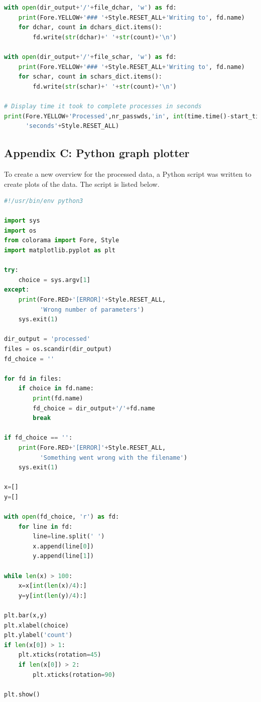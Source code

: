 \documentclass[a4paper,12pt]{article}
\begin{document}
\begin{lstlisting}[language=Python]
with open(dir_output+'/'+file_dchar, 'w') as fd:
    print(Fore.YELLOW+'### '+Style.RESET_ALL+'Writing to', fd.name)
    for dchar, count in dchars_dict.items():
        fd.write(str(dchar)+' '+str(count)+'\n')

with open(dir_output+'/'+file_schar, 'w') as fd:
    print(Fore.YELLOW+'### '+Style.RESET_ALL+'Writing to', fd.name)
    for schar, count in schars_dict.items():
        fd.write(str(schar)+' '+str(count)+'\n')

# Display time it took to complete processes in seconds
print(Fore.YELLOW+'Processed',nr_passwds,'in', int(time.time()-start_time),
      'seconds'+Style.RESET_ALL)
\end{lstlisting}

\subsection{Appendix C: Python graph plotter}
\label{app:pyplot}

To create a new overview for the processed data, a Python script was written to create plots of the data. The script is listed below.

\begin{lstlisting}[language=Python]
#!/usr/bin/env python3

import sys
import os
from colorama import Fore, Style
import matplotlib.pyplot as plt

try:
    choice = sys.argv[1]
except:
    print(Fore.RED+'[ERROR]'+Style.RESET_ALL,
          'Wrong number of parameters')
    sys.exit(1)

dir_output = 'processed'
files = os.scandir(dir_output)
fd_choice = ''

for fd in files:
    if choice in fd.name:
        print(fd.name)
        fd_choice = dir_output+'/'+fd.name
        break

if fd_choice == '':
    print(Fore.RED+'[ERROR]'+Style.RESET_ALL,
          'Something went wrong with the filename')
    sys.exit(1)
    
x=[]
y=[]
    
with open(fd_choice, 'r') as fd:
    for line in fd:
        line=line.split(' ')
        x.append(line[0])
        y.append(line[1])

while len(x) > 100:
    x=x[int(len(x)/4):]
    y=y[int(len(y)/4):]

plt.bar(x,y)
plt.xlabel(choice)
plt.ylabel('count')
if len(x[0]) > 1:
    plt.xticks(rotation=45)
    if len(x[0]) > 2:
        plt.xticks(rotation=90)
           
plt.show()
\end{lstlisting}
\end{document}
